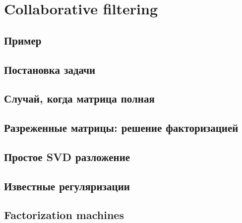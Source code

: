 \documentclass[14pt, fleqn, xcolor={dvipsnames, table}]{beamer}
\begin{document}
\section{Collaborative filtering}

\subsection{Пример} %
\subsection{Постановка задачи} %
\subsection{Случай, когда матрица полная} %
\subsection{Разреженные матрицы: решение факторизацией} %
\subsection{Простое SVD разложение}  %
\subsection{Известные регуляризации} %
\subsection{Factorization machines} %
\end{document}
